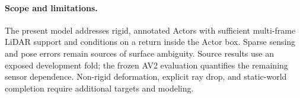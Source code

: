 \paragraph{Scope and limitations.}
The present model addresses rigid, annotated Actors with sufficient multi-frame LiDAR support and conditions
on a return inside the Actor box. Sparse sensing and pose errors remain sources of surface ambiguity.
Source results use an exposed development fold; the frozen AV2 evaluation quantifies the remaining sensor dependence.
Non-rigid deformation, explicit ray drop, and static-world completion require additional targets and modeling.
